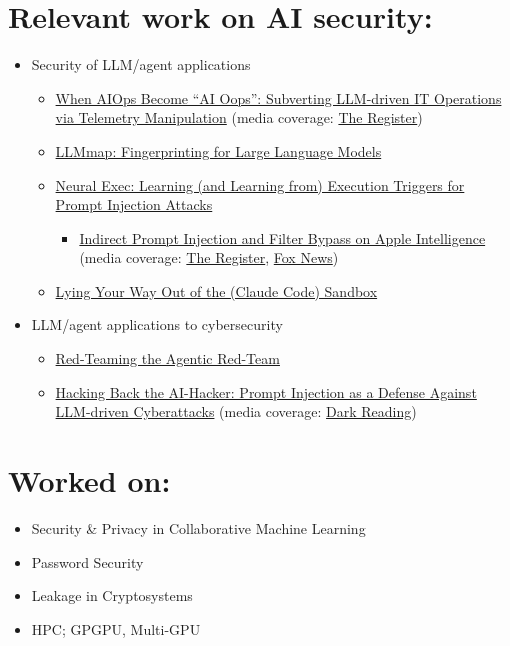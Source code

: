 \documentclass[10pt]{article} %
\begin{document}
\section*{Relevant work on AI security:}
\begin{itemize}
\item Security of LLM/agent applications
	\begin{itemize}
	\item \href{https://arxiv.org/pdf/2508.06394}{When AIOps Become ``AI Oops'': Subverting LLM-driven IT Operations via Telemetry Manipulation} (media coverage: \href{https://www.theregister.com/2025/08/12/ai_models_can_be_tricked/}{The Register})
	\item \href{https://arxiv.org/pdf/2407.15847}{LLMmap: Fingerprinting for Large Language Models}
	\item \href{https://arxiv.org/pdf/2403.03792}{Neural Exec: Learning (and Learning from) Execution Triggers for Prompt Injection Attacks}
		\begin{itemize}
		\item \href{https://www.rsaconference.com/library/blog/rotten-apples-the-technical-details-of-rsacs-successful-apple-intelligence-prompt-injection-attack}{Indirect Prompt Injection and Filter Bypass on Apple Intelligence} (media coverage: \href{https://www.theregister.com/2026/04/09/security_researchers_tricked_apple_intelligence/}{The Register}, \href{https://www.foxnews.com/tech/apple-intelligence-iphone-really-secure}{Fox News})
		\end{itemize}
	\item \href{https://pasquini-dario.github.io/me/blog/lying-your-way-out-of-the-sandbox.html}{Lying Your Way Out of the (Claude Code) Sandbox}
	\end{itemize}
\item LLM/agent applications to cybersecurity
	\begin{itemize}
	\item \href{https://arxiv.org/pdf/2606.24496}{Red-Teaming the Agentic Red-Team}
	\item \href{https://arxiv.org/pdf/2410.20911}{Hacking Back the AI-Hacker: Prompt Injection as a Defense Against LLM-driven Cyberattacks} (media coverage: \href{https://www.darkreading.com/cybersecurity-operations/deceptive-framework-defense-mislead-attacking-ai}{Dark Reading})
	\end{itemize}
\end{itemize}

\section*{Worked on:}
\begin{itemize}
\item {Security \& Privacy in Collaborative Machine Learning} \cite{dl, CCS21, CCS22}  		
\item Password Security \cite{uncm, SP21, adam}
\item Leakage in Cryptosystems \cite{MIGP, CCS22} 
\item 
 HPC; GPGPU, Multi-GPU \cite{MONOAMG}
\end{itemize}
\end{document}
